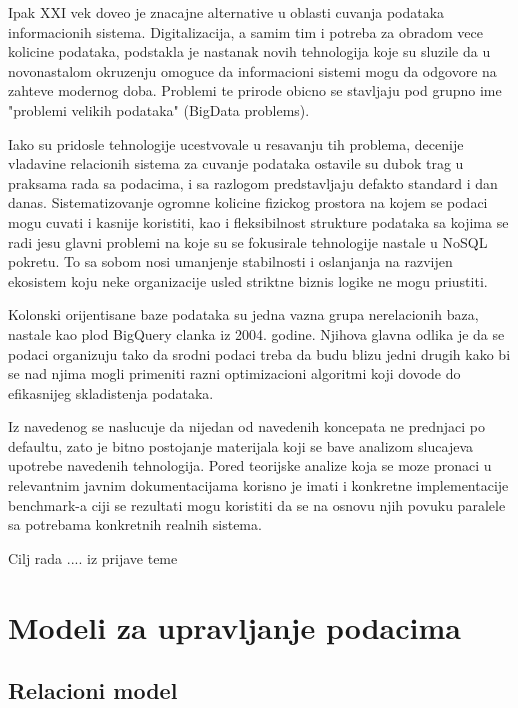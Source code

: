 \documentclass[12pt,oneside]{memoir}
\begin{document}
Ipak XXI vek doveo je znacajne alternative u oblasti cuvanja podataka informacionih sistema. Digitalizacija, a samim tim i potreba za obradom vece kolicine podataka, podstakla je nastanak novih tehnologija koje su sluzile da u novonastalom okruzenju omoguce da informacioni sistemi mogu da odgovore na zahteve modernog doba. Problemi te prirode obicno se stavljaju pod grupno ime "problemi velikih podataka" (BigData problems).

Iako su pridosle tehnologije ucestvovale u resavanju tih problema, decenije vladavine  relacionih sistema za cuvanje podataka ostavile su dubok trag u praksama rada sa podacima,  i sa razlogom predstavljaju defakto standard i dan danas. 
Sistematizovanje ogromne kolicine fizickog prostora na kojem se podaci mogu cuvati i kasnije koristiti, kao i fleksibilnost strukture podataka sa kojima se radi jesu glavni problemi na koje su se fokusirale tehnologije nastale u NoSQL pokretu. To sa sobom nosi umanjenje stabilnosti i oslanjanja na razvijen ekosistem koju neke organizacije  usled striktne biznis logike ne mogu priustiti. 

Kolonski orijentisane baze podataka su jedna vazna grupa nerelacionih baza, nastale kao plod BigQuery clanka iz 2004. godine. Njihova glavna odlika je da se podaci organizuju tako da srodni podaci treba da budu blizu jedni drugih kako bi se nad njima mogli primeniti razni optimizacioni algoritmi koji dovode do efikasnijeg skladistenja podataka.

Iz navedenog se naslucuje da nijedan od navedenih koncepata ne prednjaci po defaultu, zato je bitno postojanje materijala koji se bave analizom slucajeva upotrebe navedenih tehnologija. Pored teorijske analize koja se moze pronaci u relevantnim javnim dokumentacijama korisno je imati i konkretne implementacije benchmark-a ciji se rezultati mogu koristiti da se na osnovu  njih povuku paralele sa potrebama konkretnih realnih sistema.

Cilj rada .... iz prijave teme

\cite{PostgresHistory}


\chapter{Modeli za upravljanje podacima}
\label{chp:razrada}
\section{Relacioni model}
\end{document}
